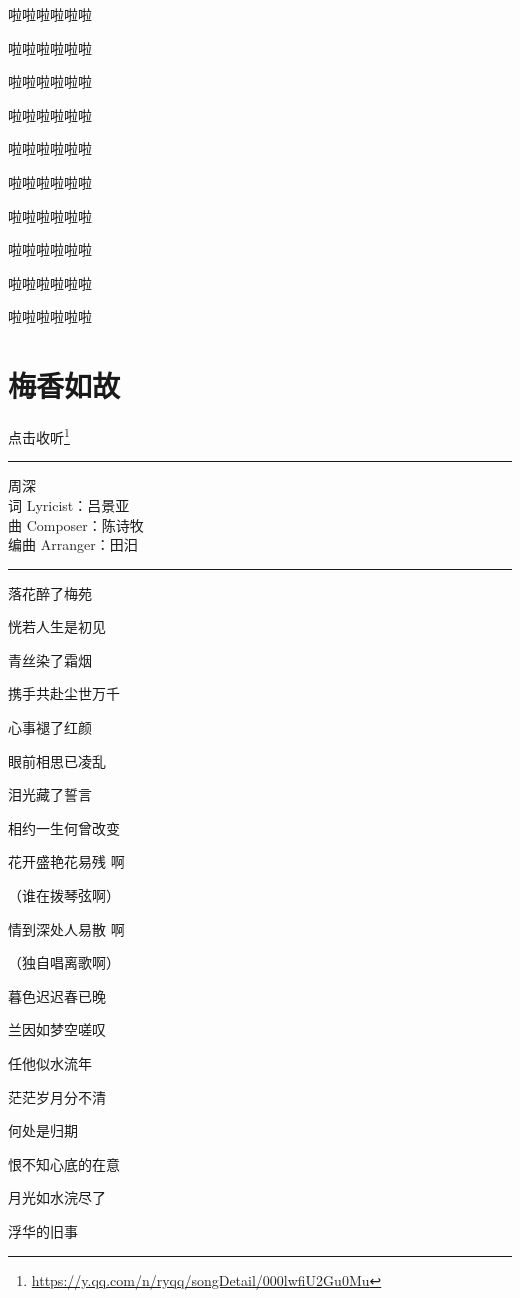 \documentclass[]{ctexbook}
\renewcommand{\href}[2]{#2\footnote{\url{#1}}}
\begin{document}
啦啦啦啦啦啦

啦啦啦啦啦啦

啦啦啦啦啦啦

啦啦啦啦啦啦

啦啦啦啦啦啦

啦啦啦啦啦啦

啦啦啦啦啦啦

啦啦啦啦啦啦

啦啦啦啦啦啦

啦啦啦啦啦啦

\section*{梅香如故}\label{plum-blossoms-fragrance-linger}


\href{https://y.qq.com/n/ryqq/songDetail/000lwfiU2Gu0Mu}{点击收听}

\begin{center}\rule{0.5\linewidth}{0.5pt}\end{center}

周深\\
词 Lyricist：吕景亚\\
曲 Composer：陈诗牧\\
编曲 Arranger：田汨

\begin{center}\rule{0.5\linewidth}{0.5pt}\end{center}

落花醉了梅苑

恍若人生是初见

青丝染了霜烟

携手共赴尘世万千

心事褪了红颜

眼前相思已凌乱

泪光藏了誓言

相约一生何曾改变

花开盛艳花易残 啊

（谁在拨琴弦啊）

情到深处人易散 啊

（独自唱离歌啊）

暮色迟迟春已晚

兰因如梦空嗟叹

任他似水流年

茫茫岁月分不清

何处是归期

恨不知心底的在意

月光如水浣尽了

浮华的旧事
\end{document}
